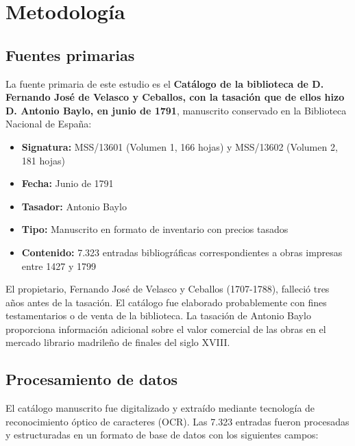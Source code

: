 \documentclass[12pt,a4paper]{article}
\begin{document}
\section{Metodología}

\subsection{Fuentes primarias}

La fuente primaria de este estudio es el \textbf{Catálogo de la biblioteca de D. Fernando José de Velasco y Ceballos, con la tasación que de ellos hizo D. Antonio Baylo, en junio de 1791}, manuscrito conservado en la Biblioteca Nacional de España:

\begin{itemize}
    \item \textbf{Signatura:} MSS/13601 (Volumen 1, 166 hojas) y MSS/13602 (Volumen 2, 181 hojas)
    \item \textbf{Fecha:} Junio de 1791
    \item \textbf{Tasador:} Antonio Baylo
    \item \textbf{Tipo:} Manuscrito en formato de inventario con precios tasados
    \item \textbf{Contenido:} 7.323 entradas bibliográficas correspondientes a obras impresas entre 1427 y 1799
\end{itemize}

El propietario, Fernando José de Velasco y Ceballos (1707-1788), falleció tres años antes de la tasación. El catálogo fue elaborado probablemente con fines testamentarios o de venta de la biblioteca. La tasación de Antonio Baylo proporciona información adicional sobre el valor comercial de las obras en el mercado librario madrileño de finales del siglo XVIII.

\subsection{Procesamiento de datos}

El catálogo manuscrito fue digitalizado y extraído mediante tecnología de reconocimiento óptico de caracteres (OCR). Las 7.323 entradas fueron procesadas y estructuradas en un formato de base de datos con los siguientes campos:
\end{document}
